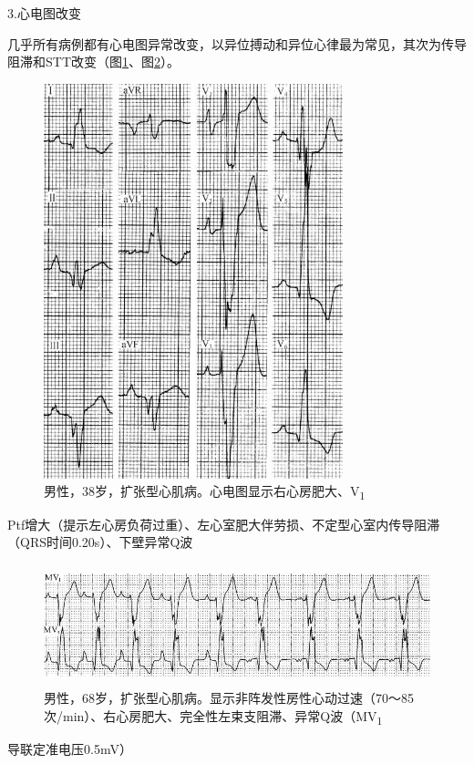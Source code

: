 3.心电图改变

几乎所有病例都有心电图异常改变，以异位搏动和异位心律最为常见，其次为传导阻滞和STT改变（图\ref{fig43-1}、图\ref{fig43-2}）。

\begin{figure}[!htbp]
 \centering
 \includegraphics[width=3.41667in,height=4.51042in]{./images/Image00704.jpg}
 \captionsetup{justification=centering}
 \caption{男性，38岁，扩张型心肌病。心电图显示右心房肥大、V\textsubscript{1}}
 \label{fig43-1}
  \end{figure} 
Ptf增大（提示左心房负荷过重）、左心室肥大伴劳损、不定型心室内传导阻滞（QRS时间0.20s）、下壁异常Q波

\begin{figure}[!htbp]
 \centering
 \includegraphics[width=5.19792in,height=1.38542in]{./images/Image00705.jpg}
 \captionsetup{justification=centering}
 \caption{男性，68岁，扩张型心肌病。显示非阵发性房性心动过速（70～85次/min）、右心房肥大、完全性左束支阻滞、异常Q波（MV\textsubscript{1}}
 \label{fig43-2}
  \end{figure} 
导联定准电压0.5mV）

